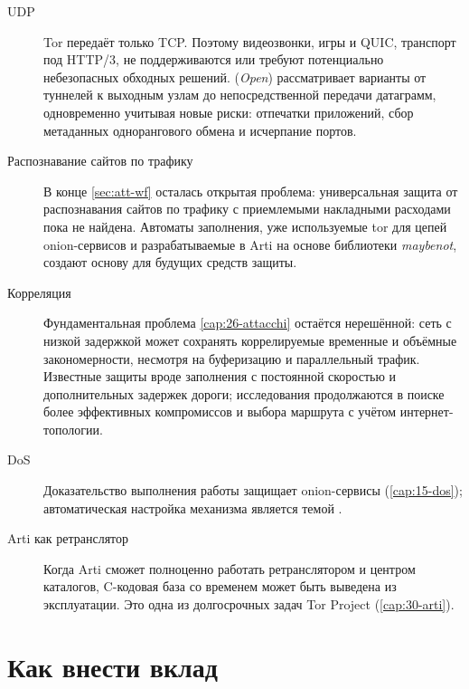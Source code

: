 \begin{description}
  \item[UDP] Tor передаёт только TCP. Поэтому видеозвонки, игры и QUIC, транспорт под HTTP/3, не поддерживаются или требуют потенциально небезопасных обходных решений.  (\emph{Open}) рассматривает варианты от туннелей к выходным узлам до непосредственной передачи датаграмм, одновременно учитывая новые риски: отпечатки приложений, сбор метаданных однорангового обмена и исчерпание портов.
  \item[Распознавание сайтов по трафику] В конце \cref{sec:att-wf} осталась открытая проблема: универсальная защита от распознавания сайтов по трафику с приемлемыми накладными расходами пока не найдена. Автоматы заполнения, уже используемые tor для цепей onion-сервисов и разрабатываемые в Arti на основе библиотеки \emph{maybenot}, создают основу для будущих средств защиты.
  \item[Корреляция] Фундаментальная проблема \cref{cap:26-attacchi} остаётся нерешённой: сеть с низкой задержкой может сохранять коррелируемые временные и объёмные закономерности, несмотря на буферизацию и параллельный трафик. Известные защиты вроде заполнения с постоянной скоростью и дополнительных задержек дороги; исследования продолжаются в поиске более эффективных компромиссов и выбора маршрута с учётом интернет-топологии.
  \item[DoS] Доказательство выполнения работы защищает onion-сервисы (\cref{cap:15-dos}); автоматическая настройка механизма является темой .
  \item[Arti как ретранслятор] Когда Arti сможет полноценно работать ретранслятором и центром каталогов, C-кодовая база со временем может быть выведена из эксплуатации. Это одна из долгосрочных задач Tor Project (\cref{cap:30-arti}).
\end{description}

\section{Как внести вклад}\label{sec:fut-contribuire}

